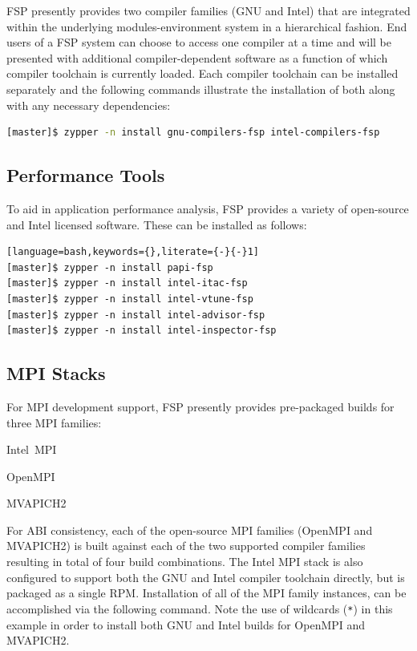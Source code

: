 \documentclass[letterpaper]{article}
\begin{document}
FSP presently provides two compiler families ({GNU} and {Intel}) that are
integrated within the underlying modules-environment system in a hierarchical
fashion. End users of a FSP system can choose to access one compiler at a time
and will be presented with additional compiler-dependent software as a function
of which compiler toolchain is currently loaded. Each compiler toolchain can be
installed separately and the following commands illustrate the installation of
both along with any necessary dependencies:

\begin{lstlisting}[language=bash]
[master]$ zypper -n install gnu-compilers-fsp intel-compilers-fsp
\end{lstlisting}

\subsection{Performance Tools}

To aid in application performance analysis, FSP provides a variety of
open-source and Intel licensed software. These can be installed as follows:

\begin{lstlisting}[language=bash,keywords={},literate={-}{-}1]
[master]$ zypper -n install papi-fsp
[master]$ zypper -n install intel-itac-fsp
[master]$ zypper -n install intel-vtune-fsp
[master]$ zypper -n install intel-advisor-fsp
[master]$ zypper -n install intel-inspector-fsp
\end{lstlisting}

\subsection{MPI Stacks} \label{sec:mpi}

For MPI development support, FSP presently provides pre-packaged builds for
three MPI families: 

\begin{itemize*}
\item Intel~MPI
\item OpenMPI
\item MVAPICH2
\end{itemize*}
 For ABI consistency, each of the open-source MPI families (OpenMPI and
 MVAPICH2) is built against each of the two supported compiler families
 resulting in total of four build combinations.  The Intel MPI stack is also
 configured to support both the GNU and Intel compiler toolchain directly, but
 is packaged as a single RPM. Installation of all of the MPI family instances,
 can be accomplished via the following command. Note the use of wildcards
 (\texttt{*}) in this example in order to install both GNU and Intel builds for
 OpenMPI and MVAPICH2.
\end{document}

